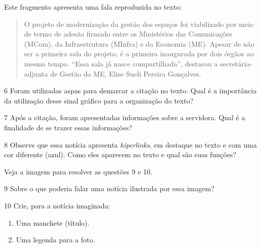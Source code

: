Este fragmento apresenta uma fala reproduzida no texto:

\begin{quote}
O projeto de modernização da gestão dos espaços foi viabilizado por
meio de termo de adesão firmado entre os Ministérios das Comunicações
(MCom), da Infraestrutura (MInfra) e da Economia (ME). Apesar de não ser
a primeira sala do projeto, é a primeira inaugurada por dois órgãos ao
mesmo tempo. ``Essa sala já nasce compartilhada'', destacou a
secretária-adjunta de Gestão do ME, Elise Sueli Pereira Gonçalves.
\end{quote}

\num{6} Foram utilizadas aspas para demarcar a citação no texto. Qual é a
importância da utilização desse sinal gráfico para a organização do
texto?


\num{7} Após a citação, foram apresentadas informações sobre a servidora.
Qual é a finalidade de se trazer essas informações?


\num{8} Observe que essa notícia apresenta \emph{hiperlinks}, em destaque no
texto e com uma cor diferente (azul). Como eles aparecem no texto e qual
são suas funções?


Veja a imagem para resolver as questões 9 e 10.


\num{9} Sobre o que poderia falar uma notícia ilustrada por essa imagem?


\num{10} Crie, para a notícia imaginada:

\begin{enumerate}
\item
  Uma manchete (título).
\item
  Uma legenda para a foto.
\end{enumerate}

